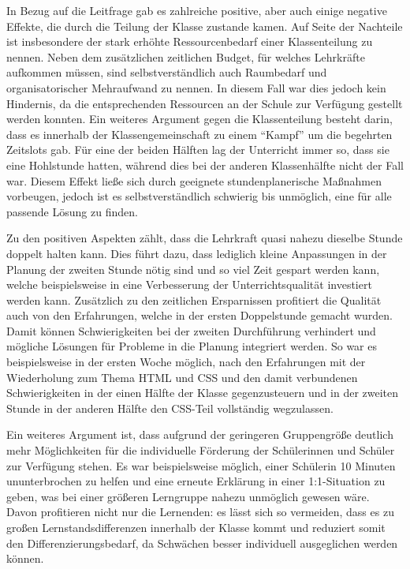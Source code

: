 In Bezug auf die Leitfrage gab es zahlreiche positive, aber auch einige negative Effekte, die durch die Teilung der Klasse zustande kamen.
Auf Seite der Nachteile ist insbesondere der stark erhöhte Ressourcenbedarf einer Klassenteilung zu nennen.
Neben dem zusätzlichen zeitlichen Budget, für welches Lehrkräfte aufkommen müssen, sind selbstverständlich auch Raumbedarf und organisatorischer Mehraufwand zu nennen.
In diesem Fall war dies jedoch kein Hindernis, da die entsprechenden Ressourcen an der Schule zur Verfügung gestellt werden konnten.
Ein weiteres Argument gegen die Klassenteilung besteht darin, dass es innerhalb der Klassengemeinschaft zu einem ``Kampf'' um die begehrten Zeitslots gab.
Für eine der beiden Hälften lag der Unterricht immer so, dass sie eine Hohlstunde hatten, während dies bei der anderen Klassenhälfte nicht der Fall war.
Diesem Effekt ließe sich durch geeignete stundenplanerische Maßnahmen vorbeugen, jedoch ist es selbstverständlich schwierig bis unmöglich, eine für alle passende Lösung zu finden.

Zu den positiven Aspekten zählt, dass die Lehrkraft quasi nahezu dieselbe Stunde doppelt halten kann.
Dies führt dazu, dass lediglich kleine Anpassungen in der Planung der zweiten Stunde nötig sind und so viel Zeit gespart werden kann, welche beispielsweise in eine Verbesserung der Unterrichtsqualität investiert werden kann.
Zusätzlich zu den zeitlichen Ersparnissen profitiert die Qualität auch von den Erfahrungen, welche in der ersten Doppelstunde gemacht wurden.
Damit können Schwierigkeiten bei der zweiten Durchführung verhindert und mögliche Lösungen für Probleme in die Planung integriert werden.
So war es beispielsweise in der ersten Woche möglich, nach den Erfahrungen mit der Wiederholung zum Thema HTML und CSS und den damit verbundenen Schwierigkeiten in der einen Hälfte der Klasse gegenzusteuern und in der zweiten Stunde in der anderen Hälfte den CSS-Teil vollständig wegzulassen.

Ein weiteres Argument ist, dass aufgrund der geringeren Gruppengröße deutlich mehr Möglichkeiten für die individuelle Förderung der Schülerinnen und Schüler zur Verfügung stehen.
Es war beispielsweise möglich, einer Schülerin 10 Minuten ununterbrochen zu helfen und eine erneute Erklärung in einer 1:1-Situation zu geben, was bei einer größeren Lerngruppe nahezu unmöglich gewesen wäre.
Davon profitieren nicht nur die Lernenden: es lässt sich so vermeiden, dass es zu großen Lernstandsdifferenzen innerhalb der Klasse kommt und reduziert somit den Differenzierungsbedarf, da Schwächen besser individuell ausgeglichen werden können.

